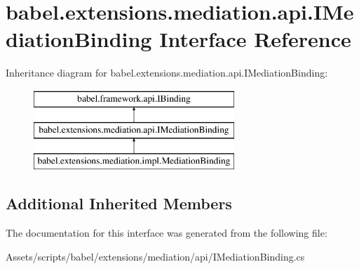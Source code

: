 \hypertarget{interfacebabel_1_1extensions_1_1mediation_1_1api_1_1_i_mediation_binding}{\section{babel.\-extensions.\-mediation.\-api.\-I\-Mediation\-Binding Interface Reference}
\label{interfacebabel_1_1extensions_1_1mediation_1_1api_1_1_i_mediation_binding}
}
Inheritance diagram for babel.\-extensions.\-mediation.\-api.\-I\-Mediation\-Binding\-:\begin{figure}[H]
\begin{center}
\leavevmode
\includegraphics[height=3.000000cm]{interfacebabel_1_1extensions_1_1mediation_1_1api_1_1_i_mediation_binding}
\end{center}
\end{figure}
\subsection*{Additional Inherited Members}


The documentation for this interface was generated from the following file\-:\begin{DoxyCompactItemize}
\item 
Assets/scripts/babel/extensions/mediation/api/I\-Mediation\-Binding.\-cs\end{DoxyCompactItemize}
